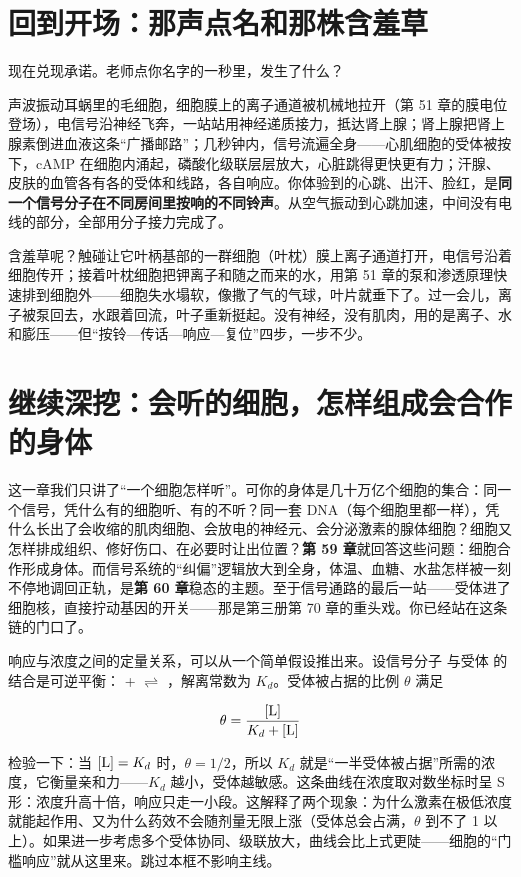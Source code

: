 \section{回到开场：那声点名和那株含羞草}

现在兑现承诺。老师点你名字的一秒里，发生了什么？

声波振动耳蜗里的毛细胞，细胞膜上的离子通道被机械地拉开（第 51 章的膜电位登场），电信号沿神经飞奔，一站站用神经递质接力，抵达肾上腺；肾上腺把肾上腺素倒进血液这条“广播邮路”；几秒钟内，信号流遍全身——心肌细胞的受体被按下，cAMP 在细胞内涌起，磷酸化级联层层放大，心脏跳得更快更有力；汗腺、皮肤的血管各有各的受体和线路，各自响应。你体验到的心跳、出汗、脸红，是\textbf{同一个信号分子在不同房间里按响的不同铃声}。从空气振动到心跳加速，中间没有电线的部分，全部用分子接力完成了。

含羞草呢？触碰让它叶柄基部的一群细胞（叶枕）膜上离子通道打开，电信号沿着细胞传开；接着叶枕细胞把钾离子和随之而来的水，用第 51 章的泵和渗透原理快速排到细胞外——细胞失水塌软，像撒了气的气球，叶片就垂下了。过一会儿，离子被泵回去，水跟着回流，叶子重新挺起。没有神经，没有肌肉，用的是离子、水和膨压——但“按铃—传话—响应—复位”四步，一步不少。

\section{继续深挖：会听的细胞，怎样组成会合作的身体}

这一章我们只讲了“一个细胞怎样听”。可你的身体是几十万亿个细胞的集合：同一个信号，凭什么有的细胞听、有的不听？同一套 DNA（每个细胞里都一样），凭什么长出了会收缩的肌肉细胞、会放电的神经元、会分泌激素的腺体细胞？细胞又怎样排成组织、修好伤口、在必要时让出位置？\textbf{第 59 章}就回答这些问题：细胞合作形成身体。而信号系统的“纠偏”逻辑放大到全身，体温、血糖、水盐怎样被一刻不停地调回正轨，是\textbf{第 60 章}稳态的主题。至于信号通路的最后一站——受体进了细胞核，直接拧动基因的开关——那是第三册第 70 章的重头戏。你已经站在这条链的门口了。

\begin{tiaozhan}
响应与浓度之间的定量关系，可以从一个简单假设推出来。设信号分子  与受体  的结合是可逆平衡： +  $\rightleftharpoons$ ，解离常数为 $K_d$。受体被占据的比例 $\theta$ 满足

\[\theta = \frac{[\mathrm{L}]}{K_d + [\mathrm{L}]}\]

检验一下：当 $[\mathrm{L}] = K_d$ 时，$\theta = 1/2$，所以 $K_d$ 就是“一半受体被占据”所需的浓度，它衡量亲和力——$K_d$ 越小，受体越敏感。这条曲线在浓度取对数坐标时呈 S 形：浓度升高十倍，响应只走一小段。这解释了两个现象：为什么激素在极低浓度就能起作用、又为什么药效不会随剂量无限上涨（受体总会占满，$\theta$ 到不了 1 以上）。如果进一步考虑多个受体协同、级联放大，曲线会比上式更陡——细胞的“门槛响应”就从这里来。跳过本框不影响主线。
\end{tiaozhan}

